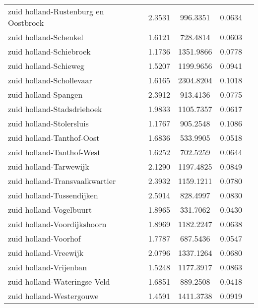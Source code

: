 \begin{longtable}{llccc}
	zuid holland-Rustenburg en Oostbroek      & 2.3531  & 996.3351  & 0.0634                 \\
	zuid holland-Schenkel                     & 1.6121  & 728.4814  & 0.0603                 \\
	zuid holland-Schiebroek                   & 1.1736  & 1351.9866 & 0.0778                 \\
	zuid holland-Schieweg                     & 1.5207  & 1199.9656 & 0.0941                 \\
	zuid holland-Schollevaar                  & 1.6165  & 2304.8204 & 0.1018                 \\
	zuid holland-Spangen                      & 2.3912  & 913.4136  & 0.0775                 \\
	zuid holland-Stadsdriehoek                & 1.9833  & 1105.7357 & 0.0617                 \\
	zuid holland-Stolersluis                  & 1.1767  & 905.2548  & 0.1086                 \\
	zuid holland-Tanthof-Oost                 & 1.6836  & 533.9905  & 0.0518                 \\
	zuid holland-Tanthof-West                 & 1.6252  & 702.5259  & 0.0644                 \\
	zuid holland-Tarwewijk                    & 2.1290  & 1197.4825 & 0.0849                 \\
	zuid holland-Transvaalkwartier            & 2.3932  & 1159.1211 & 0.0780                 \\
	zuid holland-Tussendijken                 & 2.5914  & 828.4997  & 0.0830                 \\
	zuid holland-Vogelbuurt                   & 1.8965  & 331.7062  & 0.0430                 \\
	zuid holland-Voordijkshoorn               & 1.8969  & 1182.2247 & 0.0638                 \\
	zuid holland-Voorhof                      & 1.7787  & 687.5436  & 0.0547                 \\
	zuid holland-Vreewijk                     & 2.0796  & 1337.1264 & 0.0680                 \\
	zuid holland-Vrijenban                    & 1.5248  & 1177.3917 & 0.0863                 \\
	zuid holland-Wateringse Veld              & 1.6851  & 889.2508  & 0.0418                 \\
	zuid holland-Westergouwe                  & 1.4591  & 1411.3738 & 0.0919                 \\

\end{longtable}
